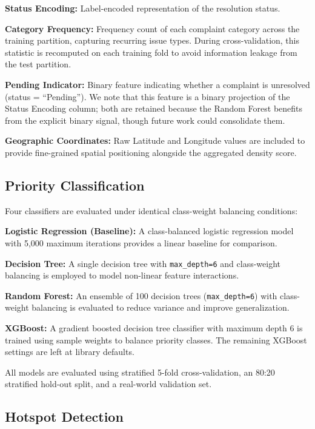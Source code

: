 \documentclass[12pt,onecolumn,draftclsnofoot]{IEEEtran}
\begin{document}
\textbf{Status Encoding:} Label-encoded representation of the resolution status.

\textbf{Category Frequency:} Frequency count of each complaint category across the training partition, capturing recurring issue types. During cross-validation, this statistic is recomputed on each training fold to avoid information leakage from the test partition.

\textbf{Pending Indicator:} Binary feature indicating whether a complaint is unresolved (status = ``Pending''). We note that this feature is a binary projection of the Status Encoding column; both are retained because the Random Forest benefits from the explicit binary signal, though future work could consolidate them.

\textbf{Geographic Coordinates:} Raw Latitude and Longitude values are included to provide fine-grained spatial positioning alongside the aggregated density score.

\subsection{Priority Classification}

Four classifiers are evaluated under identical class-weight balancing conditions:

\textbf{Logistic Regression (Baseline):} A class-balanced logistic regression model with 5,000 maximum iterations provides a linear baseline for comparison.

\textbf{Decision Tree:} A single decision tree with \texttt{max\_depth=6} and class-weight balancing is employed to model non-linear feature interactions.

\textbf{Random Forest:} An ensemble of 100 decision trees (\texttt{max\_depth=6}) with class-weight balancing is evaluated to reduce variance and improve generalization.

\textbf{XGBoost:} A gradient boosted decision tree classifier with maximum depth 6 is trained using sample weights to balance priority classes. The remaining XGBoost settings are left at library defaults.

All models are evaluated using stratified 5-fold cross-validation, an 80:20 stratified hold-out split, and a real-world validation set.

\subsection{Hotspot Detection}
\end{document}
